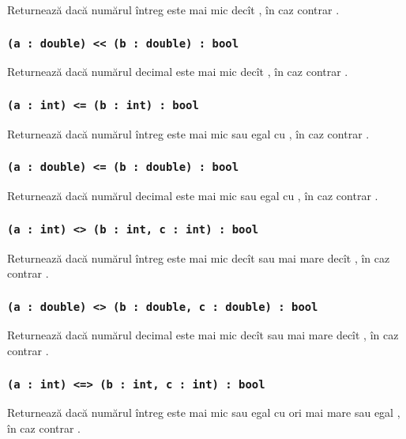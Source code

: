 Returnează \true{} dacă numărul întreg  este mai mic decît , în caz contrar \false{}.

\subsubsection{\lstinline|(a : double) << (b : double) : bool|}

Returnează \true{} dacă numărul decimal  este mai mic decît , în caz contrar \false{}.

\subsubsection{\lstinline|(a : int) <= (b : int) : bool|}

Returnează \true{} dacă numărul întreg  este mai mic sau egal cu , în caz contrar \false{}.

\subsubsection{\lstinline|(a : double) <= (b : double) : bool|}

Returnează \true{} dacă numărul decimal  este mai mic sau egal cu , în caz contrar \false{}.

\subsubsection{\lstinline|(a : int) <> (b : int, c : int) : bool|}

Returnează \true{} dacă numărul întreg  este mai mic decît  sau mai mare decît , în caz contrar \false{}.

\subsubsection{\lstinline|(a : double) <> (b : double, c : double) : bool|}

Returnează \true{} dacă numărul decimal  este mai mic decît  sau mai mare decît , în caz contrar \false{}.

\subsubsection{\lstinline|(a : int) <=> (b : int, c : int) : bool|}

Returnează \true{} dacă numărul întreg  este mai mic sau egal cu  ori mai mare sau egal , în caz contrar \false{}.

